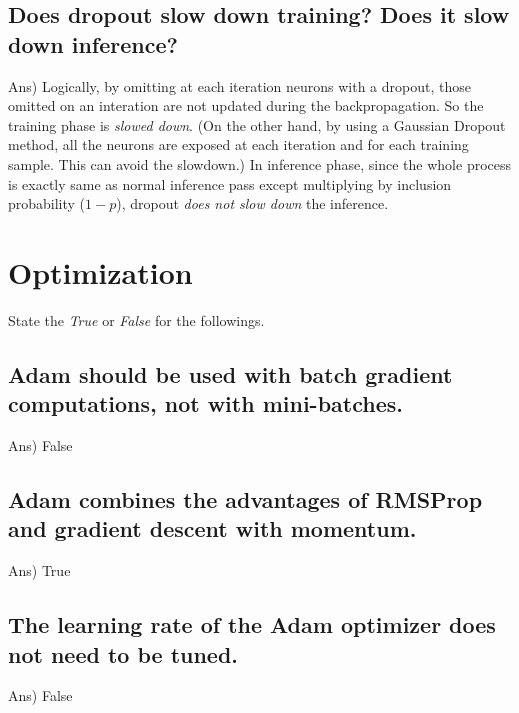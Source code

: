 \documentclass[12pt]{article}%
\begin{document}
\subsection{Does dropout slow down training? Does it slow down inference?}
Ans) Logically, by omitting at each iteration neurons with a dropout, those omitted on an interation are not updated during the backpropagation. So the training phase is \textit{slowed down}. (On the other hand, by using a Gaussian Dropout method, all the neurons are exposed at each iteration and for each training sample. This can avoid the slowdown.) In inference phase, since the whole process is exactly same as normal inference pass except multiplying by inclusion probability ($1 - p$), dropout \textit{does not slow down} the inference.
\section{Optimization}
State the \textit{True} or \textit{False} for the followings.
\subsection{Adam should be used with batch gradient computations, not with mini-batches.}
Ans) False
\subsection{Adam combines the advantages of RMSProp and gradient descent with momentum.}
Ans) True
\subsection{The learning rate of the Adam optimizer does not need to be tuned.}
Ans) False
\end{document}
